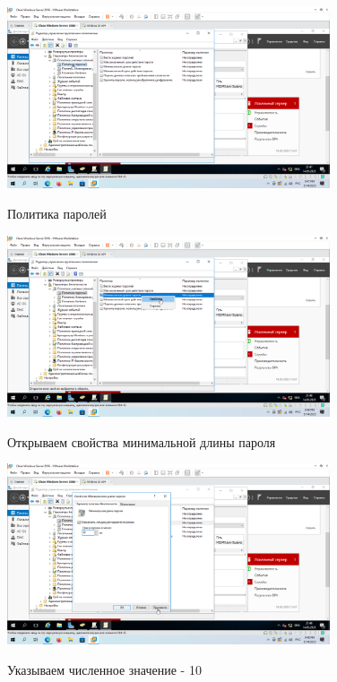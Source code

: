 \documentclass[a4paper]{article}
\begin{document}
  \begin{figure}[H]
    \centering
    \includegraphics[width=0.85\textwidth]{5_0116}
    \label{img:116}
    \caption{Политика паролей}
  \end{figure}

  \begin{figure}[H]
    \centering
    \includegraphics[width=0.85\textwidth]{5_0117}
    \label{img:117}
    \caption{Открываем свойства минимальной длины пароля}
  \end{figure}

  \begin{figure}[H]
    \centering
    \includegraphics[width=0.85\textwidth]{5_0118}
    \label{img:118}
    \caption{Указываем численное значение - 10}
  \end{figure}
\end{document}
